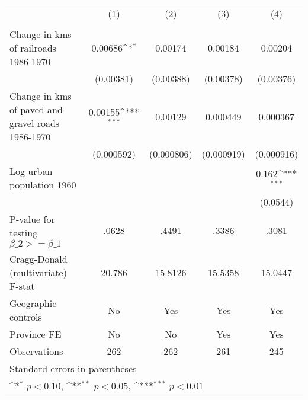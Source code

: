 {
\def\sym#1{\ifmmode^{#1}\else\(^{#1}\)\fi}
\begin{tabular}{l*{4}{c}}
\hline\hline
                &\multicolumn{1}{c}{(1)}&\multicolumn{1}{c}{(2)}&\multicolumn{1}{c}{(3)}&\multicolumn{1}{c}{(4)}\\
                &\multicolumn{1}{c}{}&\multicolumn{1}{c}{}&\multicolumn{1}{c}{}&\multicolumn{1}{c}{}\\
\hline
Change in kms of railroads 1986-1970&  0.00686\sym{*}  &  0.00174         &  0.00184         &  0.00204         \\
                &(0.00381)         &(0.00388)         &(0.00378)         &(0.00376)         \\
[1em]
Change in kms of paved and gravel roads 1986-1970&  0.00155\sym{***}&  0.00129         & 0.000449         & 0.000367         \\
                &(0.000592)         &(0.000806)         &(0.000919)         &(0.000916)         \\
[1em]
Log urban population 1960&                  &                  &                  &    0.162\sym{***}\\
                &                  &                  &                  & (0.0544)         \\
\hline
P-value for testing $\beta\_{2} >= \beta\_{1}$&    .0628         &    .4491         &    .3386         &    .3081         \\
Cragg-Donald (multivariate) F-stat&   20.786         &  15.8126         &  15.5358         &  15.0447         \\
Geographic controls&       No         &      Yes         &      Yes         &      Yes         \\
Province FE     &       No         &       No         &      Yes         &      Yes         \\
Observations    &      262         &      262         &      261         &      245         \\
\hline\hline
\multicolumn{5}{l}{\footnotesize Standard errors in parentheses}\\
\multicolumn{5}{l}{\footnotesize \sym{*} \(p<0.10\), \sym{**} \(p<0.05\), \sym{***} \(p<0.01\)}\\
\end{tabular}
}
